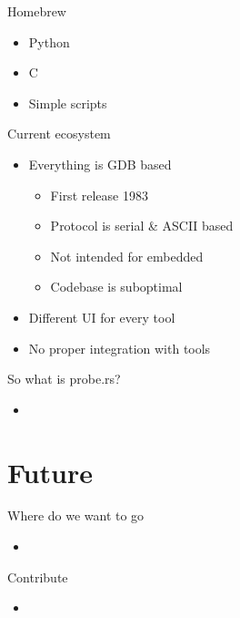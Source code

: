 \documentclass[aspectratio=1610,14pt,t]{beamer}
\begin{document}
\begin{frame}[c]{Homebrew}
  \begin{itemize}
    \item Python
    \item C
    \item Simple scripts
  \end{itemize}
\end{frame}

\begin{frame}[c]{Current ecosystem}
  \begin{itemize}
    \item Everything is GDB based
      \begin{itemize}
        \item First release 1983
        \item Protocol is serial \& ASCII based
        \item Not intended for embedded
        \item Codebase is suboptimal
      \end{itemize}
    \item Different UI for every tool
    \item No proper integration with tools
  \end{itemize}
\end{frame}

\begin{frame}[c]{So what is probe.rs?}
  \begin{itemize}
    \item 
  \end{itemize}
\end{frame}

\section{Future}

\begin{frame}[c]{Where do we want to go}
  \begin{itemize}
    \item
  \end{itemize}
\end{frame}

\begin{frame}[c]{Contribute}
  \begin{itemize}
    \item
  \end{itemize}
\end{frame}
\end{document}
